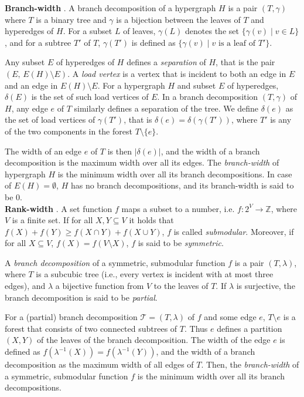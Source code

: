 \noindent
\textbf{Branch-width} \cite{DBLP:journals/tocl/LodhaOS19, DBLP:conf/sat/SaetherTV14}.
A branch decomposition of a hypergraph $H$ is a pair $(T, \gamma)$ where $T$ is a binary tree and $\gamma$ is a bijection between the leaves of $T$ and hyperedges of $H$.
For a subset $L$ of leaves, $\gamma(L)$ denotes the set $\{ \gamma(v) \; | \; v \in L \}$, and for a subtree $T'$ of $T$, $\gamma(T')$ is defined as $\{ \gamma(v) \; | \; v  \text{ is a leaf of } T' \}$.

Any subset $E$ of hyperedges of $H$ defines a {\em separation} of $H$, that is the pair $(E,\, E(H) \setminus E)$.
A {\em load vertex} is a vertex that is incident to both an edge in $E$ and an edge in $E(H) \setminus E$.
For a hypergraph $H$ and subset $E$ of hyperedges, $\delta(E)$ is the set of such load vertices of $E$.
In a branch decomposition $(T, \gamma)$ of $H$, any edge $e$ of $T$ similarly defines a separation of the tree. 
We define $\delta(e)$ as the set of load vertices of $\gamma(T')$, that is $\delta(e) = \delta(\gamma(T'))$, where $T'$ is any of the two components in the forest $T \setminus \{e\}$.

The width of an edge $e$ of $T$ is then $|\delta(e)|$, and the width of a branch decomposition is the maximum width over all its edges.
The {\em branch-width} of hypergraph $H$ is the minimum width over all its branch decompositions. In case of $E(H) = \emptyset$, $H$ has no branch decompositions, and its branch-width is said to be 0. \\

\noindent
\textbf{Rank-width} \cite{DBLP:journals/fuin/GanianHO13}.
A set function $f$ maps a subset to a number, i.e. $f : 2^V \rightarrow \mathbb{Z}$, where $V$ is a finite set.
If for all $X,Y \subseteq V$ it holds that $f(X)+f(Y) \geq f(X\cap Y) + f(X\cup Y)$, $f$ is called {\em submodular}.
Moreover, if for all $X\subseteq V$, $f(X) = f(V \setminus X)$, $f$ is said to be {\em symmetric}.

A {\em branch decomposition} of a symmetric, submodular function $f$ is a pair $(T, \lambda)$, where $T$ is a subcubic tree (i.e., every vertex is incident with at most three edges), and $\lambda$ a bijective function from $V$ to the leaves of $T$.
If $\lambda$ is surjective, the branch decomposition is said to be {\em partial}.

For a (partial) branch decomposition $\mathcal{T} = (T,\lambda)$ of $f$ and some edge $e$, $T \setminus e$ is a forest that consists of two connected subtrees of $T$.
Thus $e$ defines a partition $(X,Y)$ of the leaves of the branch decomposition.
The width of the edge $e$ is defined as $f(\lambda^{-1}(X)) = f(\lambda^{-1}(Y))$, and the width of a branch decomposition as the maximum width of all edges of $T$.
Then, the {\em branch-width} of a symmetric, submodular function $f$ is the minimum width over all its branch decompositions.

